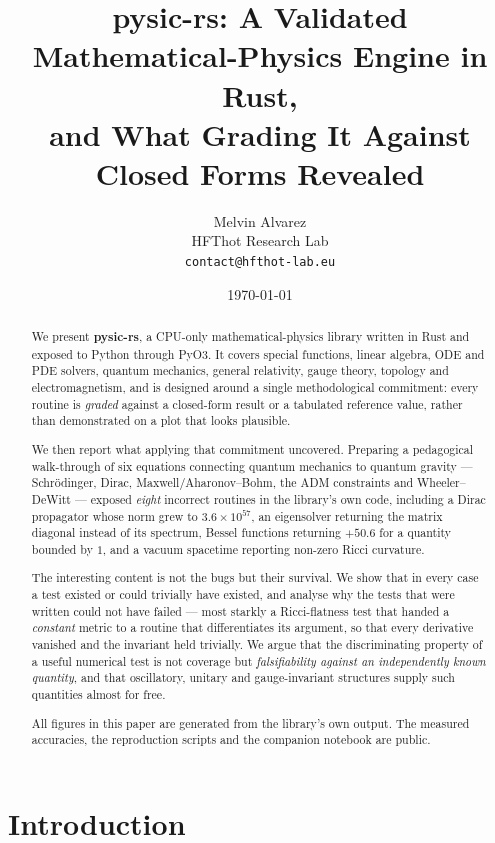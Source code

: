 \documentclass[11pt,a4paper]{article}
\title{\textbf{pysic-rs}: A Validated Mathematical-Physics Engine in Rust,\\
and What Grading It Against Closed Forms Revealed}
\author{Melvin Alvarez\\
\small HFThot Research Lab\\
\small \texttt{contact@hfthot-lab.eu}}
\date{\today}
\theoremstyle{plain}
\theoremstyle{definition}
\begin{document}
\maketitle

\begin{abstract}
\noindent
We present \textbf{pysic-rs}, a CPU-only mathematical-physics library written in
Rust and exposed to Python through PyO3. It covers special functions, linear
algebra, ODE and PDE solvers, quantum mechanics, general relativity, gauge
theory, topology and electromagnetism, and is designed around a single
methodological commitment: every routine is \emph{graded} against a closed-form
result or a tabulated reference value, rather than demonstrated on a plot that
looks plausible.

We then report what applying that commitment uncovered. Preparing a pedagogical
walk-through of six equations connecting quantum mechanics to quantum gravity ---
Schr\"odinger, Dirac, Maxwell/Aharonov--Bohm, the ADM constraints and
Wheeler--DeWitt --- exposed \emph{eight} incorrect routines in the library's own
code, including a Dirac propagator whose norm grew to $3.6\times10^{57}$, an
eigensolver returning the matrix diagonal instead of its spectrum, Bessel
functions returning $+50.6$ for a quantity bounded by $1$, and a vacuum
spacetime reporting non-zero Ricci curvature.

The interesting content is not the bugs but their survival. We show that in
every case a test existed or could trivially have existed, and analyse why the
tests that were written could not have failed --- most starkly a Ricci-flatness
test that handed a \emph{constant} metric to a routine that differentiates its
argument, so that every derivative vanished and the invariant held trivially.
We argue that the discriminating property of a useful numerical test is not
coverage but \emph{falsifiability against an independently known quantity}, and
that oscillatory, unitary and gauge-invariant structures supply such quantities
almost for free.

All figures in this paper are generated from the library's own output. The
measured accuracies, the reproduction scripts and the companion notebook are
public.
\end{abstract}

\tableofcontents
\bigskip

\section{Introduction}
\end{document}
